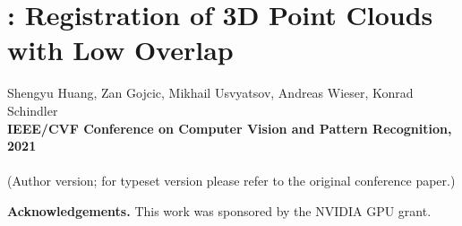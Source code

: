 \chapter[\acro: Registration of 3D Point Clouds with Low Overlap]{\acro: Registration of 3D Point Clouds with Low Overlap}
\label{chap:cvpr21}

Shengyu Huang, Zan Gojcic, Mikhail Usvyatsov, Andreas Wieser, Konrad Schindler\\
\textbf{IEEE/CVF Conference on Computer Vision and Pattern Recognition, 2021}\\
\\
(Author version; for typeset version please refer to the original conference paper.)\\

\providecommand{\subdir}{.}
\graphicspath{{\subdir/}}


\newpage






\noindent\textbf{Acknowledgements.}
{This work was sponsored by the NVIDIA GPU grant.}
\newpage

